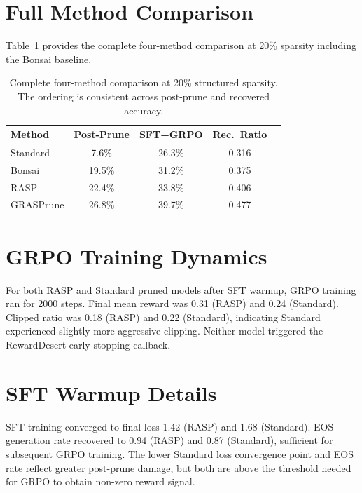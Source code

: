 \documentclass[11pt,a4paper]{article}
\begin{document}



\appendix

\section{Full Method Comparison}
\label{app:fullcomp}

Table~\ref{tab:fullcomp} provides the complete four-method comparison at 20\% sparsity including the Bonsai baseline.

\begin{table}[h]
\centering
\small
\begin{tabular}{lcccc}
\toprule
\textbf{Method} & \textbf{Post-Prune} & \textbf{SFT+GRPO} & \textbf{Rec.\ Ratio} \\
\midrule
Standard & 7.6\% & 26.3\% & 0.316 \\
Bonsai & 19.5\% & 31.2\% & 0.375 \\
RASP & 22.4\% & 33.8\% & 0.406 \\
GRASPrune & 26.8\% & 39.7\% & 0.477 \\
\bottomrule
\end{tabular}
\caption{Complete four-method comparison at 20\% structured sparsity. The ordering is consistent across post-prune and recovered accuracy.}
\label{tab:fullcomp}
\end{table}

\section{GRPO Training Dynamics}
\label{app:grpo}

For both RASP and Standard pruned models after SFT warmup, GRPO training ran for 2000 steps.
Final mean reward was 0.31 (RASP) and 0.24 (Standard).
Clipped ratio was 0.18 (RASP) and 0.22 (Standard), indicating Standard experienced slightly more aggressive clipping.
Neither model triggered the RewardDesert early-stopping callback.

\section{SFT Warmup Details}
\label{app:sft}

SFT training converged to final loss 1.42 (RASP) and 1.68 (Standard).
EOS generation rate recovered to 0.94 (RASP) and 0.87 (Standard), sufficient for subsequent GRPO training.
The lower Standard loss convergence point and EOS rate reflect greater post-prune damage, but both are above the threshold needed for GRPO to obtain non-zero reward signal.
\end{document}
